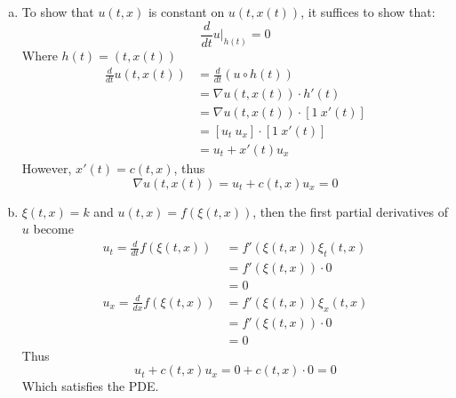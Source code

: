 \documentclass{article} %
\begin{document}
\begin{enumerate}[(a)]
  \item To show that $u(t,x)$ is constant on $u(t,x(t))$, it suffices
    to show that:
    $$\frac{d}{dt} u\Big|_{h(t)} = 0$$
    Where $h(t) = (t, x(t))$
    \begin{align*}
      \frac{d}{dt} u(t, x(t)) &=
      \frac{d}{dt}(u \circ h(t)) \\
      &= \nabla u(t, x(t)) \cdot h'(t) \\
      &= \nabla u(t, x(t)) \cdot [1~ x'(t)] \\
      &= [u_t~u_x] \cdot [1~ x'(t)] \\
      &= u_t + x'(t)u_x
    \end{align*}
    However, $x'(t) = c(t, x)$, thus
    \[
      \nabla u(t, x(t)) = u_t + c(t,x)u_x = 0
    \]
  \item $\xi(t, x) = k$ and $u(t, x) = f(\xi(t,x))$, then the first
    partial derivatives of $u$ become
    \begin{align*}
      u_t = \frac{d}{dt}f(\xi(t,x)) &= f'(\xi(t,x))\xi_t(t,x)\\
      &= f'(\xi(t,x)) \cdot 0 \\
      &= 0\\
      u_x = \frac{d}{dx}f(\xi(t,x)) &= f'(\xi(t,x))\xi_x(t,x) \\
      &= f'(\xi(t,x))\cdot 0 \\
      &= 0
    \end{align*}
    Thus
    \[
      u_t + c(t,x)u_x = 0 + c(t,x)\cdot 0 = 0
    \]
    Which satisfies the PDE.
\end{enumerate}
\end{document}
